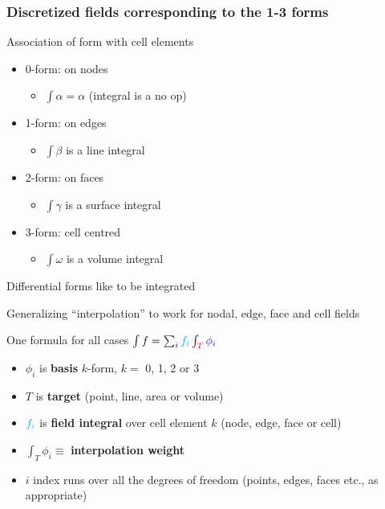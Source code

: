 \documentclass[aspectratio=169]{beamer}
\begin{document}
\begin{frame}[t]
  \frametitle{Discretized fields corresponding to the 1-3 forms}
    \begin{block}{Association of form with cell elements}
      \begin{itemize}%
	  \item 0-form: {\color{red} on nodes}
        \begin{itemize}
          \item $\int \alpha = \alpha$ (integral is a no op)
        \end{itemize}
      \item 1-form: {\color{red} on edges}
        \begin{itemize}
          \item $\int \beta$ is a line integral
        \end{itemize}
      \item 2-form: {\color{red} on faces}
        \begin{itemize}
          \item $\int \gamma$ is a surface integral
        \end{itemize}
      \item 3-form: {\color{red} cell centred}
        \begin{itemize}
          \item $\int \omega$ is a volume integral
        \end{itemize}
    \end{itemize}
  \end{block}
  \begin{block}{Differential forms like to be integrated}
  \end{block}
\end{frame}

\begin{frame}[fragile]{Generalizing ``interpolation'' to work for nodal, edge, face and cell fields}
\begin{block}{One formula for all cases}
$\int f = \sum_i {\color{cyan} f_i} \int_{\color{red} T} {\color{blue} \phi_i}$
\begin{itemize}
\item {\color{blue} $\phi_i$} is \textbf{basis} $k$-form, $k =$ 0, 1, 2 or 3
\item {\color{red} $T$} is \textbf{target} (point, line, area or volume)
\item ${\color{cyan} f_i}$ is \textbf{field integral} over cell element $k$ (node, edge, face or cell)
\item $\int_T \phi_i \equiv$ \textbf{interpolation weight}
\item $i$ index runs over all the degrees of freedom (points, edges, faces etc., as appropriate)
\end{itemize}
\end{block}
\end{frame}
\end{document}
